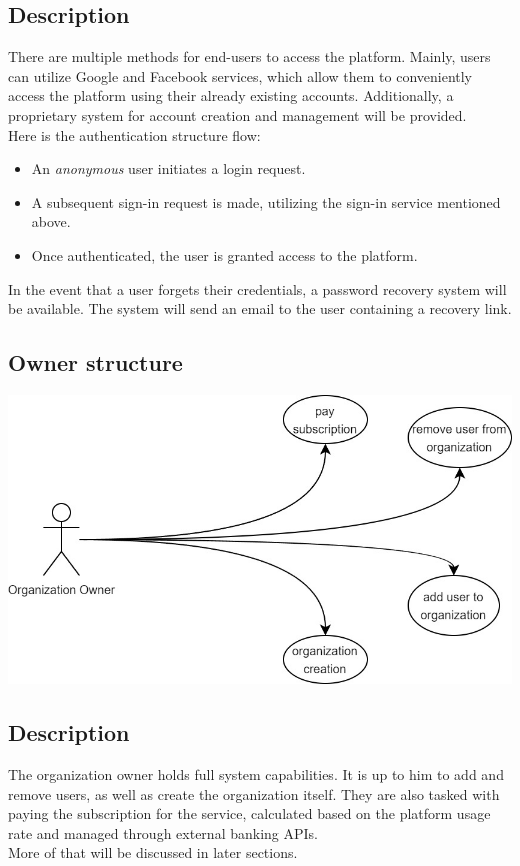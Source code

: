 \documentclass{article}
\begin{document}
\subsection*{Description}
There are multiple methods for end-users to access the platform. Mainly, users can utilize Google and Facebook services, which allow them to conveniently access the platform using their already existing accounts. Additionally, a proprietary system for account creation and management will be provided.\\
Here is the authentication structure flow:
\begin{itemize}
    \item  An \textit{anonymous} user initiates a login request.
    \item A subsequent sign-in request is made, utilizing the sign-in service mentioned above.
    \item  Once authenticated, the user is granted access to the platform.
\end{itemize}
In the event that a user forgets their credentials, a password recovery system will be available. The system will send an email to the user containing a recovery link.
\subsection{Owner structure}
\includegraphics[width=\textwidth, keepaspectratio]{images/UseCaseDiagram/UseCaseOwner.jpg}
\subsection*{Description}
The organization owner holds full system capabilities. It is up to him to add and remove users, as well as create the organization itself. They are also tasked with paying the subscription for the service, calculated based on the platform usage rate and managed through external banking APIs.\\
More of that will be discussed in later sections.
\end{document}
